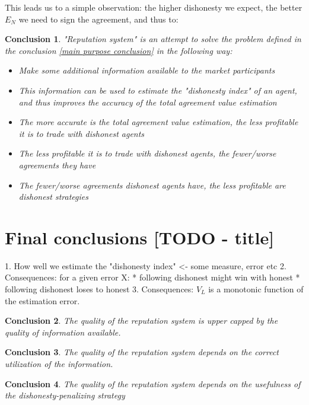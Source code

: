 \documentclass{article}
\newtheorem{conclusion}{Conclusion}[section]
\begin{document}
This leads us to a simple observation: the higher dishonesty we expect, the better $E_N$ we need to sign the agreement, and thus to:

\begin{conclusion}

"Reputation system" is an attempt to solve the problem defined in the conclusion \ref{main purpose conclusion} in the following way:

\begin{itemize}
    \item{Make some additional information available to the market participants}
    \item{This information can be used to estimate the "dishonesty index" of an agent, and thus improves the accuracy of the total agreement value estimation}
    \item{The more accurate is the total agreement value estimation, the less profitable it is to trade with dishonest agents}
    \item{The less profitable it is to trade with dishonest agents, the fewer/worse agreements they have}
    \item{The fewer/worse agreements dishonest agents have, the less profitable are dishonest strategies}
\end{itemize}

\end{conclusion}


\section{Final conclusions [TODO - title]}

1. How well we estimate the "dishonesty index" <- some measure, error etc
2. Consequences: for a given error X:
    *   following dishonest might win with honest
    *   following dishonest loses to honest
3. Consequences: $V_L$ is a monotonic function of the estimation error.

\begin{conclusion}
The quality of the reputation system is upper capped by the quality of information available.
\end{conclusion}

\begin{conclusion}
The quality of the reputation system depends on the correct utilization of the information.
\end{conclusion}

\begin{conclusion}
The quality of the reputation system depends on the usefulness of the dishonesty-penalizing strategy
\end{conclusion}
\end{document}
